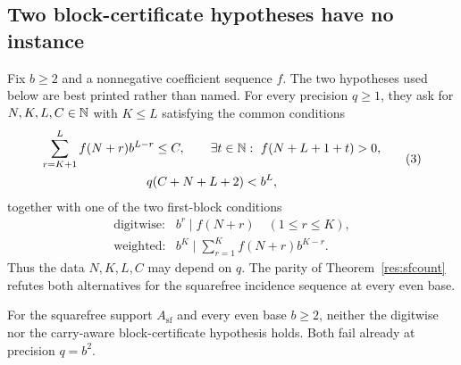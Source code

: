 \documentclass[11pt]{article}
\newcommand{\Asf}{A_{\mathrm{sf}}}
\begin{document}
\subsection{Two block-certificate hypotheses have no instance}

Fix $b\ge2$ and a nonnegative coefficient sequence $f$.  The two hypotheses
used below are best printed rather than named.  For every precision $q\ge1$,
they ask for $N,K,L,C\in\mathbb{N}$ with $K\le L$ satisfying the common conditions
\[
\begin{gathered}
 \sum_{r=K+1}^{L}f(N+r)b^{L-r}\le C,\qquad
 \exists t\in\N:\ f(N+L+1+t)>0,\\
 q(C+N+L+2)<b^L,
\end{gathered}
\tag{3}\label{eq:block-common}
\]
together with one of the two first-block conditions
\[
\begin{array}{ll}
\text{digitwise:}& b^r\mid f(N+r)\quad(1\le r\le K),\\[2mm]
\text{weighted:}&
b^K\mid\displaystyle\sum_{r=1}^{K}f(N+r)b^{K-r}.
\end{array}
\tag{4}\label{eq:block-first}
\]
Thus the data $N,K,L,C$ may depend on $q$.  The parity of
Theorem~\ref{res:sfcount} refutes both alternatives for the squarefree
incidence sequence at every even base.

\begin{corollary}\label{res:blind}
For the squarefree support $\Asf$ and every even base $b\ge2$, neither the digitwise
nor the carry-aware block-certificate hypothesis holds.  Both fail already at
precision $q=b^2$.
\end{corollary}
\end{document}
